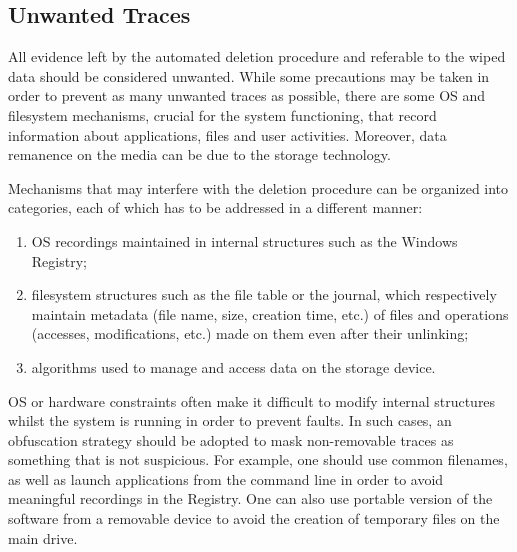 \documentclass[10pt, conference, compsocconf]{IEEEtran}
\begin{document}
\subsection{Unwanted Traces}
All evidence left by the automated deletion procedure and referable to the wiped data should be considered unwanted.
While some precautions may be taken in order to prevent as many unwanted traces as possible, there are some OS and filesystem mechanisms, crucial for the system functioning, that record information about applications, files and user activities. Moreover,
data remanence on the media can be due to the storage technology.

Mechanisms that may interfere with the deletion procedure can be organized into categories, each of which has to be addressed in a different manner:
\begin{enumerate}
 \item OS recordings maintained in internal structures such as the Windows Registry;
 \item filesystem structures such as the file table or the journal, which respectively maintain metadata (file name, size, creation time, etc.) of files and operations (accesses, modifications, etc.) made on them even after their unlinking;
 \item algorithms used to manage and access data on the storage device.
\end{enumerate}

OS or hardware constraints often make it difficult to modify internal structures whilst the system is running in order to prevent faults. In such cases, an obfuscation strategy should be adopted to mask non-removable traces as something that is not suspicious. For example, one should use common filenames, as well as launch applications from the command line in order to avoid meaningful recordings in the Registry. One can also use portable version of the software from a removable device to avoid the creation of temporary files on the main drive.
\end{document}
